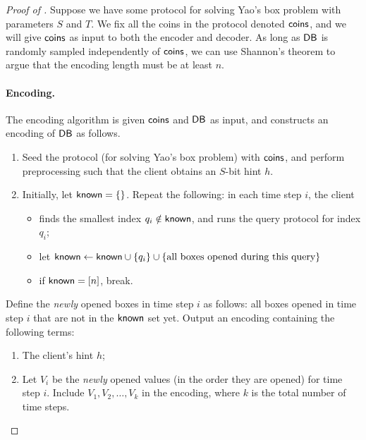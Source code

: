 \begin{proof}[Proof of ]
Suppose we have some protocol for solving Yao's box problem 
with parameters $S$ and $T$. 
We fix all the coins in the protocol denoted ${\sf coins}$,
and we will give ${\sf coins}$ as input to 
both the encoder and decoder. 
As long as ${\sf DB}$ is randomly sampled independently of ${\sf coins}$,
we can use Shannon's theorem to argue
that the encoding length must be at least $n$.

\paragraph{Encoding.}
The encoding algorithm is given ${\sf coins}$ and ${\sf DB}$ as input,
and constructs an encoding of ${\sf DB}$ as follows.

    \begin{enumerate}[leftmargin=6mm]
        \item Seed the protocol (for solving Yao's box problem) 
with ${\sf coins}$, and 
perform preprocessing
such that the client obtains an $S$-bit hint $h$.
        \item 
Initially, let ${\sf known} = \{\}$. 
Repeat the following: 
in each time step $i$, the client 
\begin{itemize}[leftmargin=5mm]
\item finds the smallest 
index $q_i \notin {\sf known}$, and 
runs the query protocol for index $q_i$; 
\item 
let ${\sf known} \leftarrow {\sf known} 
\cup \{q_i\} \cup \{\text{all boxes opened during this query}\}$
\item if ${\sf known} = [n]$, break. %
\end{itemize}
    \end{enumerate}

Define the {\it newly} opened boxes in 
time step $i$ as follows: 
all boxes opened in time step $i$ that are not in the ${\sf known}$ 
set yet. 
Output an encoding containing the following terms:
\begin{enumerate}[leftmargin=6mm]
\item 
The client's hint $h$;
\item 
Let $V_i$ be the {\it newly} opened values  
(in the order they are opened)
for time step $i$.
Include $V_1, V_2, \ldots, V_k$ 
in the encoding, where $k$ 
is the total number of time steps.
\end{enumerate}


\end{proof}
